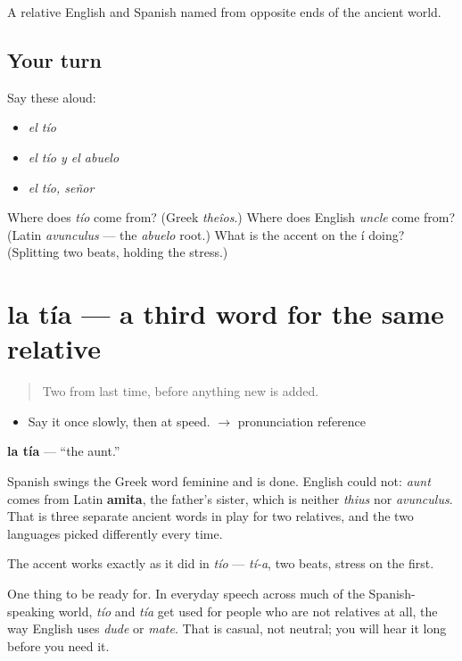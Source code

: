 \begin{grammarlens}[title={What you've built}]
A relative English and Spanish named from opposite ends of the ancient world.
\end{grammarlens}

\subsection*{Your turn}
Say these aloud:

\begin{itemize}
\raggedright
  \item \emph{el tío}
  \item \emph{el tío y el abuelo}
  \item \emph{el tío, señor}
\end{itemize}

\begin{tcolorbox}[breakable,colback=teal!4,colframe=teal!35!black,title={Before you move on}]
Where does \emph{tío} come from? (Greek \emph{theîos}.) Where does English \emph{uncle} come from? (Latin \emph{avunculus} --- the \emph{abuelo} root.) What is the accent on the í doing? (Splitting two beats, holding the stress.)
\end{tcolorbox}
\section[la tía]{la tía --- a third word for the same relative}

\label{lesson:ES-C307-tia}



\begin{quote}
Two from last time, before anything new is added.
\end{quote}

\begin{sounds}
\begin{itemize}
\raggedright
  \item Say it once slowly, then at speed. $\to$ pronunciation reference
\end{itemize}
\end{sounds}

\begin{cousinweb}
\textbf{la tía} --- \textquotedblleft{}the aunt.\textquotedblright{}

Spanish swings the Greek word feminine and is done. English could not: \emph{aunt} comes from Latin \textbf{amita}, the father's sister, which is neither \emph{thius} nor \emph{avunculus}. That is three separate ancient words in play for two relatives, and the two languages picked differently every time.

The accent works exactly as it did in \emph{tío} --- \emph{tí-a}, two beats, stress on the first.

One thing to be ready for. In everyday speech across much of the Spanish-speaking world, \emph{tío} and \emph{tía} get used for people who are not relatives at all, the way English uses \emph{dude} or \emph{mate}. That is casual, not neutral; you will hear it long before you need it.
\end{cousinweb}


